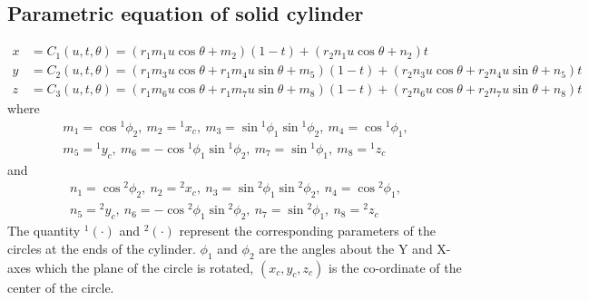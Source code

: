 \documentclass[12pt,a4]{article}
\begin{document}
\subsection{Parametric equation of solid cylinder}\label{app:parametric_u_v_solid_cyl}
\begin{align}
x & = C_1(u,t,\theta)=\left(r_1m_1u\cos\theta +m_2 \right)\left(1-t \right)+\left(r_2n_1u\cos\theta+n_2 \right)t\\
y & = C_2(u,t,\theta)=\left(r_1m_3u\cos\theta +r_1m_4u\sin\theta +m_5 \right)\left(1-t \right)+\left(r_2n_3u\cos\theta+r_2n_4u\sin\theta+n_5 \right)t\\
z & = C_3(u,t,\theta)=\left(r_1m_6u\cos\theta +r_1m_7u\sin\theta +m_8 \right)\left(1-t \right)+\left(r_2n_6u\cos\theta+r_2n_7u\sin\theta+n_8 \right)t
\end{align}
where
\begin{align*}
m_1 = \cos{}^1\phi_2,~m_2 = {}^1x_c,~m_3 = \sin{}^1\phi_1\sin{}^1\phi_2,~m_4=\cos{}^1\phi_1, \nonumber \\
m_5 = {}^1y_c,~m_6=-\cos{}^1\phi_1\sin{}^1\phi_2,~m_7=\sin{}^1\phi_1,~m_8={}^1z_c \nonumber
\end{align*}
and
\begin{align*}
n_1 = \cos{}^2\phi_2,~n_2 = {}^2x_c,~n_3 = \sin{}^2\phi_1\sin{}^2\phi_2,~n_4=\cos{}^2\phi_1, \nonumber \\
n_5 = {}^2y_c,~n_6=-\cos{}^2\phi_1\sin{}^2\phi_2,~n_7=\sin{}^2\phi_1,~n_8={}^2z_c \nonumber
\end{align*}
The quantity ${}^1\left(\cdot\right)$ and ${}^2\left(\cdot\right)$ represent the corresponding parameters of the circles at the ends of the cylinder. $\phi_1$ and $\phi_2$ are the angles about the Y and X-axes which the plane of the circle is rotated, $(x_c,y_c,z_c)$ is the co-ordinate of the center of the circle.
\end{document}
